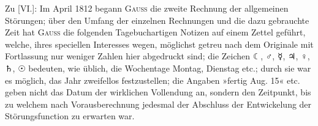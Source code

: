 \clearpage
\begingroup
{}
\renewcommand{\headrulewidth}{0pt}
\begingroup
\newcommand{\BJournalDay}[1]{{\upshape\AstroSymbols #1}}
\par\noindent\hspace*{\parindent}Zu [VI.]: Im April 1812 begann \textsc{Gauss} die zweite Rechnung der
allgemeinen Störungen; über den Umfang der einzelnen Rechnungen und die dazu
gebrauchte Zeit hat \textsc{Gauss} die folgenden Tagebuchartigen Notizen auf einem
Zettel geführt, welche, ihres speciellen Interesses wegen, möglichst getreu nach
dem Originale mit Fortlassung nur weniger Zahlen hier abgedruckt sind; die Zeichen
\BJournalDay{☾}, \BJournalDay{♂}, \BJournalDay{☿}, \BJournalDay{♃},
\BJournalDay{♀}, \BJournalDay{♄}, \BJournalDay{☉} bedeuten, wie üblich, die
Wochentage Montag, Dienstag etc.; durch sie war es möglich, das Jahr zweifellos
festzustellen; die Angaben »fertig Aug. 15« etc. geben nicht das Datum der
wirklichen Vollendung an, sondern den Zeitpunkt, bis zu welchem nach
Vorausberechnung jedesmal der Abschluss der Entwickelung der Störungsfunction
zu erwarten war.

